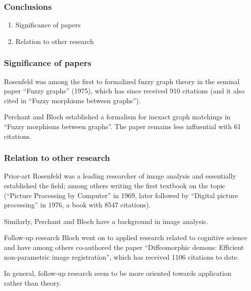 
\begin{frame}
	\frametitle{Conclusions}

	\begin{enumerate}
		\item Significance of papers
		\item Relation to other research
	\end{enumerate}
\end{frame}


\begin{frame}
	\frametitle{Significance of papers}

	Rosenfeld was among the first to formalized fuzzy graph theory in the seminal paper ``Fuzzy graphs'' (1975), which has since received 910 citations (and it also cited in ``Fuzzy morphisms between graphs'').

	\vspace*{2em}

	Perchant and Bloch established a formalism for inexact graph matchings in ``Fuzzy morphisms between graphs''. The paper remains less influential with 61 citations.
\end{frame}



\begin{frame}
	\frametitle{Relation to other research}

%

	\begin{block}{Prior-art}
		Rosenfeld was a leading researcher of image analysis and essentially established the field; among others writing the first textbook on the topic (``Picture Processing by Computer'' in 1969, later followed by ``Digital picture processing'' in 1976, a book with 8547 citations).

		\vspace*{2em}

		Similarly, Perchant and Bloch have a background in image analysis.
	\end{block}

	\begin{block}{Follow-up research}
		Bloch went on to applied research related to cognitive science and have among others co-authored the paper ``Diffeomorphic demons: Efficient non-parametric image registration'', which has received 1106 citations to date.

		\vspace*{2em}

		In general, follow-up research seem to be more oriented towards application rather than theory.
	\end{block}
\end{frame}
